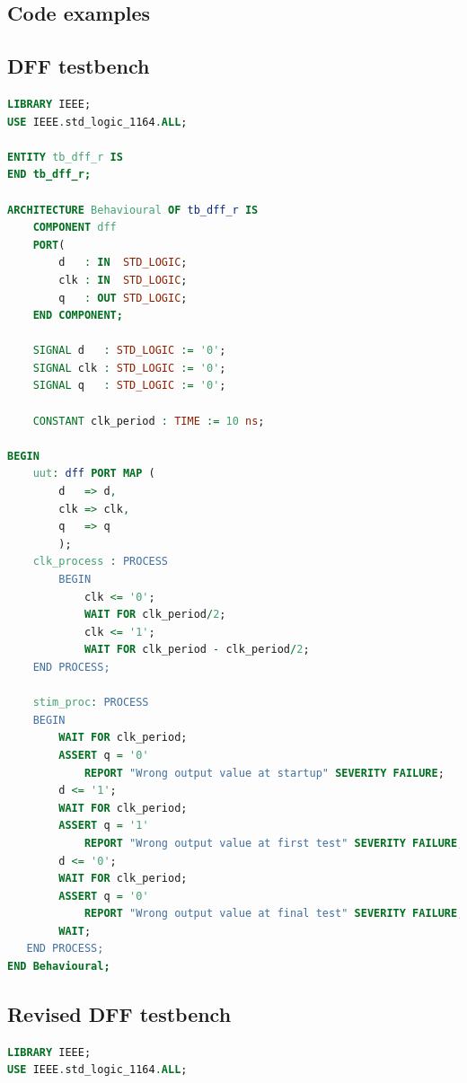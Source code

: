 \documentclass[11pt,british]{article}
\begin{document}
\begin{appendices}

\section{Code examples}
\subsection{DFF testbench}
\label{app:dfftestbench}

\begin{lstlisting}[language=VHDL, tabsize=4, frame=single, framesep=2mm, belowskip=4pt, aboveskip=4pt, showstringspaces=false, basicstyle=\scriptsize]
LIBRARY IEEE;
USE IEEE.std_logic_1164.ALL;

ENTITY tb_dff_r IS
END tb_dff_r;

ARCHITECTURE Behavioural OF tb_dff_r IS
	COMPONENT dff
    PORT(
		d 	: IN  STD_LOGIC;
        clk : IN  STD_LOGIC;
		q 	: OUT STD_LOGIC;
    END COMPONENT;
    
	SIGNAL d   : STD_LOGIC := '0';
	SIGNAL clk : STD_LOGIC := '0';
	SIGNAL q   : STD_LOGIC := '0';

	CONSTANT clk_period : TIME := 10 ns;
	
BEGIN
	uut: dff PORT MAP (
        d 	=> d,
        clk => clk,
		q 	=> q
        );
	clk_process : PROCESS
		BEGIN
			clk <= '0';
			WAIT FOR clk_period/2;
			clk <= '1';
			WAIT FOR clk_period - clk_period/2;
	END PROCESS;
	
	stim_proc: PROCESS
	BEGIN		
     	WAIT FOR clk_period;
     	ASSERT q = '0'
			REPORT "Wrong output value at startup" SEVERITY FAILURE;
		d <= '1';
     	WAIT FOR clk_period;
     	ASSERT q = '1'
			REPORT "Wrong output value at first test" SEVERITY FAILURE;
		d <= '0';
     	WAIT FOR clk_period;
     	ASSERT q = '0'
			REPORT "Wrong output value at final test" SEVERITY FAILURE;
		WAIT;
   END PROCESS;
END Behavioural;
\end{lstlisting}

\newpage{}
\subsection{Revised DFF testbench}
\label{app:dfftestbench2}
\begin{lstlisting}[language=VHDL, tabsize=4, frame=single, framesep=2mm, belowskip=4pt, aboveskip=4pt, showstringspaces=false, basicstyle=\scriptsize]
LIBRARY IEEE;
USE IEEE.std_logic_1164.ALL;


\end{lstlisting}
\end{appendices}
\end{document}
